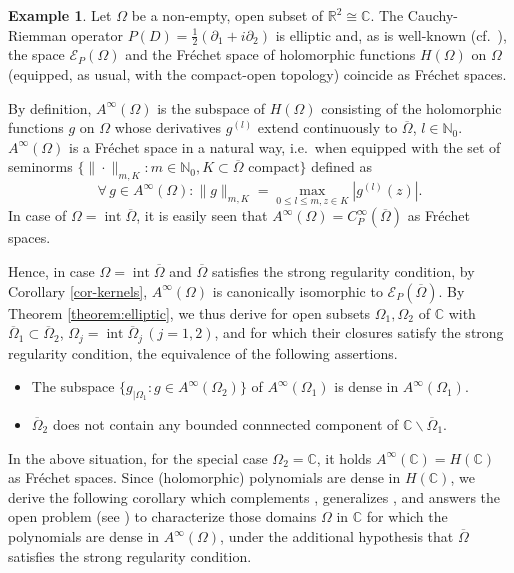 \documentclass[10pt,leqno]{amsart}
\theoremstyle{definition}
\newtheorem{example}[prop]{Example}
\newcommand{\R}{\mathbb R}
\newcommand{\N}{\mathbb N}
\newcommand{\C}{\mathbb C}
\begin{document}
\begin{example}\label{example:holomorphic}
	Let $\Omega$ be a non-empty, open subset of $\R^2\cong\C$. The Cauchy-Riemman operator $P(D)=\frac{1}{2}\left(\partial_1+i\partial_2\right)$ is elliptic and, as is well-known (cf.\ \cite[Theorem 4.4.2]{Hor1}), the space $\mathscr{E}_P(\Omega)$ and the Fr\'echet space of holomorphic functions $H(\Omega)$ on $\Omega$ (equipped, as usual, with the compact-open topology) coincide as Fr\'echet spaces.
	
	By definition, $A^\infty(\Omega)$ is the subspace of $H(\Omega)$ consisting of the holomorphic functions $g$ on $\Omega$ whose derivatives $g^{(l)}$ extend continuously to $\overline{\Omega}$, $l\in\N_0$. $A^\infty(\Omega)$ is a Fr\'echet space in a natural way, i.e.\ when equipped with the set of seminorms $\{\|\cdot\|_{m,K}\colon m\in\N_0, K\subset\overline{\Omega}\text{ compact}\}$ defined as
	$$\forall\,g\in A^\infty(\Omega)\colon\|g\|_{m,K}=\max_{0\leq l\leq m, z\in K}|g^{(l)}(z)|.$$
	In case of $\Omega=\operatorname{int}\overline{\Omega}$, it is easily seen that $A^\infty(\Omega)=C^\infty_P(\overline{\Omega})$ as Fr\'echet spaces.
	
	Hence, in case $\Omega=\operatorname{int}\overline{\Omega}$ and $\overline{\Omega}$ satisfies the strong regularity condition, by Corollary \ref{cor-kernels}, $A^\infty(\Omega)$ is canonically isomorphic to $\mathscr{E}_P(\overline{\Omega})$. By Theorem \ref{theorem:elliptic}, we thus derive for open subsets $\Omega_1, \Omega_2$ of $\C$ with $\overline{\Omega}_1\subset\overline{\Omega}_2$, $\Omega_j=\operatorname{int}\overline{\Omega}_j\, (j=1,2)$, and for which their closures satisfy the strong regularity condition, the equivalence of the following assertions.
	\begin{itemize}
		\item[(i)] The subspace $\{g_{\mid\Omega_1}\colon g\in A^\infty(\Omega_2)\}$ of $A^\infty(\Omega_1)$ is dense in $A^\infty(\Omega_1)$.
		\item[(ii)] $\overline{\Omega}_2$ does not contain any bounded connnected component of $\C\backslash\overline{\Omega}_1$.
	\end{itemize}
	In the above situation, for the special case $\Omega_2=\C$, it holds $A^\infty(\C)=H(\C)$ as Fr\'echet spaces. Since (holomorphic) polynomials are dense in $H(\C)$, we derive the following corollary which complements \cite[Theorem 5.1]{NeZa15}, generalizes \cite[Theorem 5.2]{NeZa15}, and answers the open problem (see \cite[Introduction]{GaNe16}) to characterize those domains $\Omega$ in $\C$ for which the polynomials are dense in $A^\infty(\Omega)$, under the additional hypothesis that $\overline{\Omega}$ satisfies the strong regularity condition.  
\end{example}
\end{document}
